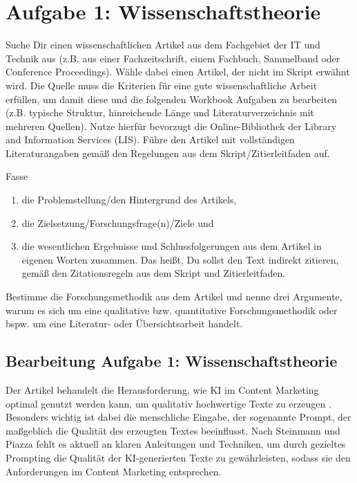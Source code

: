\section*{Aufgabe 1: Wissenschaftstheorie}

\begin{enumerate}
	\itshape{
	\item Suche Dir einen wissenschaftlichen Artikel aus dem Fachgebiet der IT und Technik aus (z.B. aus einer Fachzeitschrift, einem Fachbuch, Sammelband oder Conference Proceedings). Wähle dabei einen Artikel, der nicht im Skript erwähnt wird. Die Quelle muss die Kriterien für eine gute wissenschaftliche Arbeit erfüllen, um damit diese und die folgenden Workbook Aufgaben zu bearbeiten (z.B. typische Struktur, hinreichende Länge und Literaturverzeichnis mit mehreren Quellen). Nutze hierfür bevorzugt die Online-Bibliothek der Library and Information Services (LIS). Führe den Artikel mit vollständigen Literaturangaben gemäß den Regelungen aus dem Skript/Zitierleitfaden auf.
	\item Fasse
	      \begin{enumerate}
		      \item die Problemstellung/den Hintergrund des Artikels,
		      \item die Zielsetzung/Forschungsfrage(n)/Ziele und
		      \item die wesentlichen Ergebnisse und Schlussfolgerungen aus dem Artikel in eigenen Worten zusammen. Das heißt, Du sollst den Text indirekt zitieren, gemäß den Zitationsregeln aus dem Skript und Zitierleitfaden.
	      \end{enumerate}
	\item Bestimme die Forschungsmethodik aus dem Artikel und nenne drei Argumente, warum es sich um eine qualitative bzw. quantitative Forschungsmethodik oder bspw. um eine Literatur- oder Übersichtsarbeit handelt.}
\end{enumerate}

\clearpage

\subsection*{Bearbeitung Aufgabe 1: Wissenschaftstheorie}


Der Artikel behandelt die Herausforderung, wie \ac{KI} im Content Marketing optimal genutzt werden kann, um qualitativ hochwertige Texte zu erzeugen \parencite[S. 402-404]{steinmann2024}. Besonders wichtig ist dabei die menschliche Eingabe, der sogenannte Prompt, der maßgeblich die Qualität des erzeugten Textes beeinflusst. Nach Steinmann und Piazza fehlt es aktuell an klaren Anleitungen und Techniken, um durch gezieltes Prompting die Qualität der KI-generierten Texte zu gewährleisten, sodass sie den Anforderungen im Content Marketing entsprechen.

